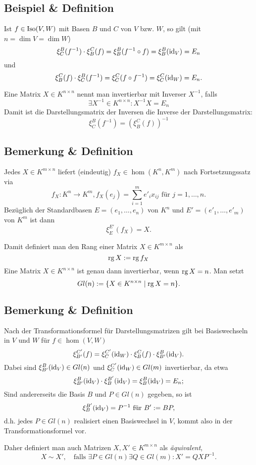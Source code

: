 \subsection{Beispiel \& Definition}
	Ist $ f\in \operatorname{Iso}(V,W) $ mit Basen $ B $ und $ C $ von $ V $ bzw. $ W $, so gilt (mit $ n=\dim V = \dim W $)
		\[ \xi_C^B(f^{-1})\cdot \xi_B^C(f) = \xi_B^B(f^{-1}\circ f) = \xi_B^B(\operatorname{id}_V) = E_n \]
	und
		\[ \xi_B^C(f)\cdot \xi_C^B(f^{-1})=\xi_C^C(f\circ f^{-1}) = \xi_C^C(\operatorname{id}_W)=E_n. \]
		
	\begin{Definition}
	Eine Matrix $ X\in K^{n\times n} $ nennt man invertierbar mit Inverser $ X^{-1} $, falls
		\[ \exists X^{-1}\in K^{n\times n}:X^{-1}X = E_n \]
	Damit ist die Darstellungsmatrix der Inversen die Inverse der Darstellungsmatrix:
		\[ \xi_C^B(f^{-1}) = (\xi_B^C(f))^{-1} \]
	\end{Definition}
\subsection{Bemerkung \& Definition}
	Jedes $ X\in K^{m\times n} $ liefert (eindeutig) $ f_X\in \hom(K^n,K^m) $ nach Fortsetzungssatz via
		\[ f_X:K^n\to K^m, f_X(e_j) = \sum_{i=1}^{m} e'_ix_{ij} \text{ für } j=1,\dots,n. \]
	Bezüglich der Standardbasen $ E = (e_1,\dots,e_n) $ von $ K^n $ und $ E'=(e'_1,\dots,e'_m) $ von $ K^m $ ist dann
		\[ \xi_E^{E'}(f_X) = X. \]

	\begin{Definition}
	Damit definiert man den Rang einer Matrix $ X\in K^{m\times n} $ als 
		\[ \operatorname{rg} X:=\operatorname{rg} f_X \]
	Eine Matrix $ X\in K^{n\times n} $ ist genau dann invertierbar, wenn $ \operatorname{rg} X = n $. Man setzt
		\[ Gl(n):= \{X\in K^{n\times n}\mid \operatorname{rg} X =n\}. \]
	\end{Definition}
\subsection{Bemerkung \& Definition}
	Nach der Transformationsformel für Darstellungsmatrizen gilt bei Basiswechseln in $ V $ und $ W $ für $ f\in \hom(V,W) $
		\[ \xi_{B'}^{C'}(f) = \xi_C^{C'}(\operatorname{id}_W)\cdot \xi_B^C(f)\cdot \xi_{B'}^B(\operatorname{id}_V). \]
	Dabei sind $ \xi_{B'}^B(\operatorname{id}_V)\in Gl(n) $ und $ \xi_C^{C'}(\operatorname{id}_W)\in Gl(m) $ invertierbar, da etwa
		\[ \xi^B_{B'}(\operatorname{id}_V)\cdot\xi_B^{B'}(\operatorname{id}_V) = \xi_B^B(\operatorname{id}_V)=E_n; \]
	Sind andererseits die Basis $ B $ und $ P\in Gl(n) $ gegeben, so ist
		\[ \xi_B^{B'}(\operatorname{id}_V)=P^{-1} \text{ für } B':= BP, \]
	d.h. jedes $ P\in Gl(n) $ realisiert einen Basiswechsel in $ V $, kommt also in der Transformationsformel vor.
	
	\begin{Definition}
	Daher definiert man auch Matrizen $ X,X'\in K^{m\times n} $ als \emph{äquivalent},
		\[ X\sim X',\quad \text{falls }\exists P\in Gl(n)\exists Q\in Gl(m):X' = QXP^{-1}.  \]
	\end{Definition}
